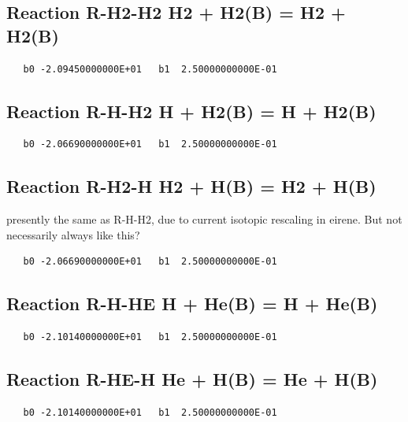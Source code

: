 \documentclass[12pt]{article}
\begin{document}
\subsection{
Reaction R-H2-H2 H2 + H2(B) = H2 + H2(B) }
\begin{small}\begin{verbatim}
   b0 -2.09450000000E+01   b1  2.50000000000E-01
\end{verbatim}\end{small}
\newpage

\subsection{
Reaction R-H-H2 H + H2(B) = H + H2(B) }
\begin{small}\begin{verbatim}
   b0 -2.06690000000E+01   b1  2.50000000000E-01
\end{verbatim}\end{small}
\newpage

\subsection{
Reaction R-H2-H H2 + H(B) = H2 + H(B) }
presently the same as R-H-H2, due to current isotopic rescaling in eirene.
But not necessarily always like this?

\begin{small}\begin{verbatim}
   b0 -2.06690000000E+01   b1  2.50000000000E-01
\end{verbatim}\end{small}
\newpage

\subsection{
Reaction R-H-HE H + He(B) = H + He(B) }
\begin{small}\begin{verbatim}
   b0 -2.10140000000E+01   b1  2.50000000000E-01
\end{verbatim}\end{small}
\newpage

\subsection{
Reaction R-HE-H He + H(B) = He + H(B) }
\begin{small}\begin{verbatim}
   b0 -2.10140000000E+01   b1  2.50000000000E-01
\end{verbatim}\end{small}
\newpage
\end{document}
